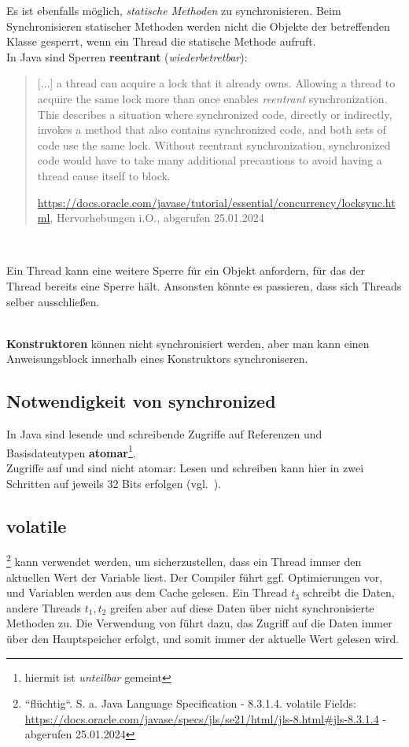Es ist ebenfalls möglich, \textit{statische Methoden} zu synchronisieren.
Beim Synchronisieren statischer Methoden werden nicht die Objekte der betreffenden Klasse gesperrt, wenn ein Thread die statische Methode aufruft.\\

In Java sind Sperren \textbf{reentrant} (\textit{wiederbetretbar}):

\blockquote[\url{https://docs.oracle.com/javase/tutorial/essential/concurrency/locksync.html}, Hervorhebungen i.O., abgerufen 25.01.2024]{
     [...] a thread can acquire a lock that it already owns. Allowing a thread to acquire the same lock more than once enables \textit{reentrant} synchronization. This describes a situation where synchronized code, directly or indirectly, invokes a method that also contains synchronized code, and both sets of code use the same lock. Without reentrant synchronization, synchronized code would have to take many additional precautions to avoid having a thread cause itself to block.
}\\

\begin{tcolorbox}
    Ein Thread kann eine weitere Sperre für ein Objekt anfordern, für das der Thread bereits eine Sperre hält.
    Ansonsten könnte es passieren, dass sich Threads selber ausschließen.
\end{tcolorbox}\\

\textbf{Konstruktoren} können nicht synchronisiert werden, aber man kann einen Anweisungsblock innerhalb eines Konstruktors synchroniseren.

\subsection*{Notwendigkeit von synchronized}

In Java sind lesende und schreibende Zugriffe auf Referenzen und Basisdatentypen \textbf{atomar}\footnote{
hiermit ist \textit{unteilbar} gemeint
}.\\

Zugriffe auf  und  sind nicht atomar: Lesen und schreiben kann hier in zwei Schritten auf jeweils 32 Bits erfolgen (vgl.~\cite[30]{Oec22}).\\

\subsection*{volatile}
\footnote{``flüchtig``.
S. a. Java Language Specification - 8.3.1.4. volatile Fields: \url{https://docs.oracle.com/javase/specs/jls/se21/html/jls-8.html#jls-8.3.1.4} - abgerufen 25.01.2024
} kann verwendet werden, um sicherzustellen, dass ein Thread immer den aktuellen Wert der Variable liest.
Der Compiler führt ggf. Optimierungen vor, und Variablen werden aus dem Cache gelesen.
Ein Thread $t_3$ schreibt die Daten, andere Threads $t_1, t_2$ greifen aber auf diese Daten über nicht synchronisierte Methoden zu.
Die Verwendung von  führt dazu, das Zugriff auf die Daten immer über den Hauptspeicher erfolgt, und somit immer der aktuelle Wert gelesen wird.

